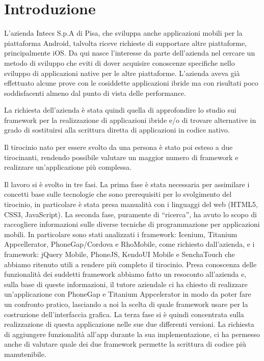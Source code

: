 \chapter{Introduzione}
	L'azienda Intecs S.p.A di Pisa, che sviluppa anche applicazioni mobili per la 
	piattaforma Android, talvolta riceve richieste di supportare altre piattaforme,
	principalmente iOS. Da qui nasce l'interesse da parte dell'azienda nel
	cercare un metodo di sviluppo \crossplat che eviti di dover acquisire 
	conoscenze specifiche nello sviluppo di applicazioni native per le altre 
	piattaforme. L'azienda aveva già effettuato alcune prove con le cosiddette
	applicazioni ibride ma con risultati poco soddisfacenti almeno dal punto di
	vista delle performance.
	
	La richiesta dell'azienda è stata quindi quella di approfondire lo studio sui
	framework per la realizzazione di applicazioni ibride e/o di trovare alternative
	in grado di sostituirsi alla scrittura diretta di applicazioni in codice 
	nativo.
	
	Il tirocinio nato per essere svolto da una persona è stato poi esteso a due
	tirocinanti, rendendo possibile valutare un maggior numero di framework e 
	realizzare un'applicazione più complessa.
	
	Il lavoro si è svolto in tre fasi. La prima fase è stata necessaria per 
	assimilare i concetti base sulle tecnologie che sono prerequisiti per lo 
	svolgimento del tirocinio, in particolare è stata presa manualità con i 
	linguaggi del web (HTML5, CSS3, JavaScript). La seconda fase, puramente di
	``ricerca'', ha avuto lo scopo di raccogliere informazioni sulle diverse 
	tecniche di programmazione per applicazioni mobili. In particolare sono 
	stati analizzati i framework: Icenium, Titanium Appcellerator, 
	PhoneGap/Cordova e RhoMobile, come richiesto dall'azienda, e i framework:
	jQuery Mobile, PhoneJS, KendoUI Mobile e SenchaTouch che abbiamo ritenuto
	utili a rendere più completo il tirocinio.
	Presa conoscenza delle funzionalità dei suddetti framework abbiamo fatto un
	resoconto all'azienda e, sulla base di queste informazioni, il tutore 
	aziendale ci ha chiesto di realizzare un'applicazione con PhoneGap e Titanium 
	Appcelerator in modo da poter fare un confronto pratico, lasciando a noi la
	scelta di quale framework usare per la costruzione dell'interfaccia grafica.
	La terza fase si è quindi concentrata sulla realizzazione di questa 
	applicazione nelle sue due differenti versioni. La richiesta di aggiungere
	funzionalità all'app durante la sua implementazione, ci ha permesso anche di 
	valutare quale dei due framework permette la scrittura di codice più 
	manutenibile.
	
